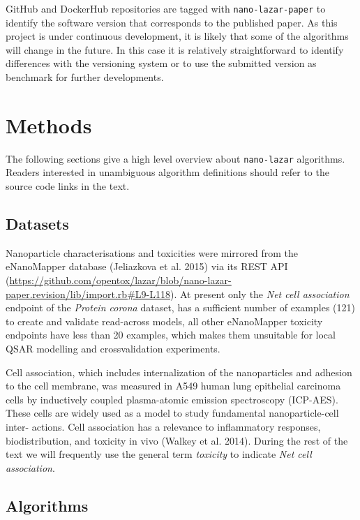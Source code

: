 \documentclass[utf8]{frontiersHLTH} %
\begin{document}
GitHub and DockerHub repositories are tagged with
\texttt{nano-lazar-paper} to identify the software version that
corresponds to the published paper. As this project is under continuous
development, it is likely that some of the algorithms will change in the
future. In this case it is relatively straightforward to identify
differences with the versioning system or to use the submitted version
as benchmark for further developments.

\section{Methods}\label{methods}

The following sections give a high level overview about
\texttt{nano-lazar} algorithms. Readers interested in unambiguous
algorithm definitions should refer to the source code links in the text.

\subsection{Datasets}\label{datasets}

Nanoparticle characterisations and toxicities were mirrored from the
eNanoMapper database (Jeliazkova et al. 2015) via its REST API
(\url{https://github.com/opentox/lazar/blob/nano-lazar-paper.revision/lib/import.rb\#L9-L118}).
At present only the \emph{Net cell association} endpoint of the
\emph{Protein corona} dataset, has a sufficient number of examples (121)
to create and validate read-across models, all other eNanoMapper
toxicity endpoints have less than 20 examples, which makes them
unsuitable for local QSAR modelling and crossvalidation experiments.

Cell association, which includes internalization of the nanoparticles
and adhesion to the cell membrane, was measured in A549 human lung
epithelial carcinoma cells by inductively coupled plasma-atomic emission
spectroscopy (ICP-AES). These cells are widely used as a model to study
fundamental nanoparticle-cell inter- actions. Cell association has a
relevance to inflammatory responses, biodistribution, and toxicity in
vivo (Walkey et al. 2014). During the rest of the text we will
frequently use the general term \emph{toxicity} to indicate \emph{Net
cell association}.

\subsection{Algorithms}\label{algorithms}
\end{document}
